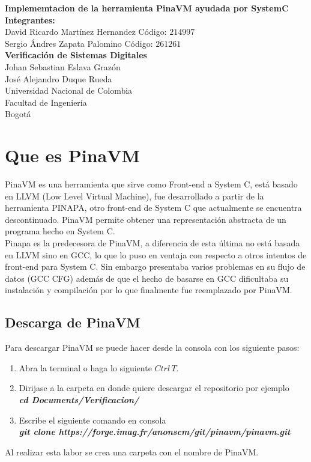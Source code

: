 \documentclass[12pt,graphicx,caption,rotating]{article}
\begin{document}
\begin{titlepage}
\begin{center}
{\huge \textbf{Implememtacion de la herramienta PinaVM ayudada por SystemC}}\\[5cm]
{\Large \textbf{Integrantes:}}\\
{\Large David Ricardo Martínez Hernandez Código: $214997$}\\
{\Large Sergio Ándres Zapata Palomino Código: $261261$}\\[5cm]
{\Large \textbf{Verificación de Sistemas Digitales}}\\
{\Large Johan Sebastian Eslava Grazón}\\
{\Large José Alejandro Duque Rueda}\\[6cm]
{\Large Universidad Nacional de Colombia}\\
{\Large Facultad de Ingeniería}\\
{\Large Bogotá}\\
\date{}
\end{center}
\end{titlepage}


\section{Que es PinaVM}
\noindent
PinaVM es una herramienta que sirve como Front-end a System C, está basado en LLVM (Low Level Virtual Machine), fue desarrollado a partir de la herramienta PINAPA, otro front-end de System C que actualmente se encuentra descontinuado. PinaVM permite obtener una representación abstracta de un programa hecho en System C.\\
Pinapa es la predecesora de PinaVM, a diferencia de esta última no está basada en LLVM sino en GCC, lo que lo puso en ventaja con respecto a otros intentos de front-end para System C. Sin embargo presentaba varios problemas en su flujo de datos (GCC CFG) además de que el hecho de basarse en GCC dificultaba su instalación y compilación  por lo que finalmente fue reemplazado por PinaVM.

\subsection{Descarga de PinaVM}
\noindent
Para descargar PinaVM se puede hacer desde la consola con los siguiente pasos:
\begin{enumerate}
 \item Abra la terminal o haga lo siguiente $Ctrl \, T$.
 \item Dirijase a la carpeta en donde quiere descargar el repositorio por ejemplo\\ \textbf{\textit{cd Documents/Verificacion/}}
 \item Escribe el siguiente comando en consola\\ \textbf{\textit{git clone https://forge.imag.fr/anonscm/git/pinavm/pinavm.git}}
\end{enumerate}
\noindent
Al realizar esta labor se crea una carpeta con el nombre de PinaVM.
\end{document}
